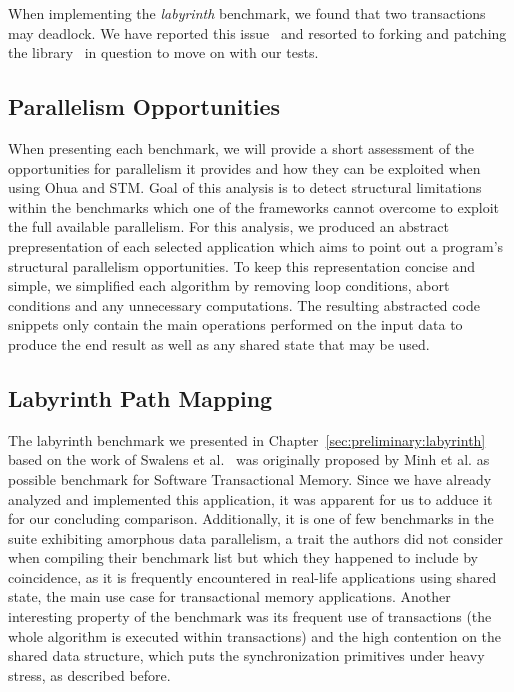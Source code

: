 When implementing the \emph{labyrinth} benchmark, we found that two transactions may deadlock.
We have reported this issue~\cite{wittwer2020stmissue} and resorted to forking and patching the library~\cite{wittwer2020stm} in question to move on with our tests.


\subsection{Parallelism Opportunities}
\label{sec:experiments:opportunities}

When presenting each benchmark, we will provide a short assessment of the opportunities for parallelism it provides and how they can be exploited when using Ohua and STM.
Goal of this analysis is to detect structural limitations within the benchmarks which one of the frameworks cannot overcome to exploit the full available parallelism.
For this analysis, we produced an abstract prepresentation of each selected application which aims to point out a program's structural parallelism opportunities.
To keep this representation concise and simple, we simplified each algorithm by removing loop conditions, abort conditions and any unnecessary computations.
The resulting abstracted code snippets only contain the main operations performed on the input data to produce the end result as well as any shared state that may be used.


\subsection{Labyrinth Path Mapping}
\label{sec:experiments:labyrinth}

The labyrinth benchmark we presented in Chapter~\ref{sec:preliminary:labyrinth} based on the work of Swalens et al.~\cite{swalens2016transactional} was originally proposed by Minh et al. as possible benchmark for Software Transactional Memory.
Since we have already analyzed and implemented this application, it was apparent for us to adduce it for our concluding comparison.
Additionally, it is one of few benchmarks in the suite exhibiting amorphous data parallelism, a trait the authors did not consider when compiling their benchmark list but which they happened to include by coincidence, as it is frequently encountered in real-life applications using shared state, the main use case for transactional memory applications.
Another interesting property of the benchmark was its frequent use of transactions (the whole algorithm is executed within transactions) and the high contention on the shared data structure, which puts the synchronization primitives under heavy stress, as described before.

